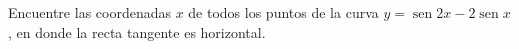 \item Encuentre las coordenadas $x$ de todos los puntos de la curva $y = \operatorname{sen} 2x - 2 \operatorname{sen} x$, en donde la recta tangente es horizontal.
